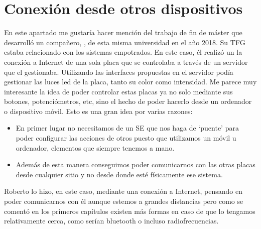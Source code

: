 \section{Conexión desde otros dispositivos}\label{sec:TRConexiones}
En este apartado me gustaría hacer mención del trabajo de fin de máster que desarrolló un compañero, \cite{RPC0027}
, de esta misma universidad en el año 2018. Su TFG estaba relacionado con los sistemas empotrados. En este caso, él realizó un la conexión a Internet de una sola placa que se controlaba a través de un servidor que el gestionaba. Utilizando las interfaces propuestas en el servidor podía gestionar las luces led de la placa, tanto su color como intensidad. Me parece muy interesante la idea de poder controlar estas placas ya no solo mediante sus botones, potenciómetros, etc, sino el hecho de poder hacerlo desde un ordenador o dispositivo móvil. 
Esto es una gran idea por varias razones:
\begin{itemize}
\item En primer lugar no necesitamos de un SE que nos haga de `puente' para poder configurar las acciones de otros puesto que utilizamos un móvil u ordenador, elementos que siempre tenemos a mano. 
\item Además de esta manera conseguimos poder comunicarnos con las otras placas desde cualquier sitio y no desde donde esté físicamente ese sistema.
\end{itemize}
Roberto lo hizo, en este caso, mediante una conexión a Internet, pensando en poder comunicarnos con él aunque estemos a grandes distancias pero como se comentó en los primeros capítulos existen más formas en caso de que lo tengamos relativamente cerca, como serían bluetooth o incluso radiofrecuencias.


